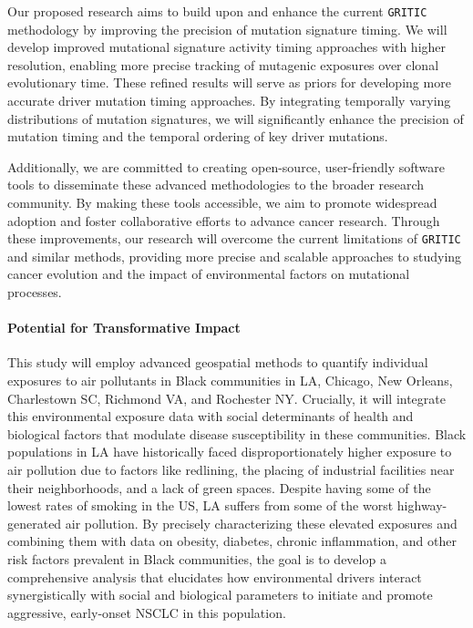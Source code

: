 \vspace{1em}
\noindent
Our proposed research aims to build upon and enhance the current \texttt{GRITIC} methodology by 
improving the precision of mutation signature timing. 
We will develop improved mutational signature activity timing approaches with higher resolution, 
enabling more precise tracking of mutagenic exposures over clonal evolutionary time. 
These refined results will serve as priors for developing more accurate driver mutation timing approaches. 
By integrating temporally varying distributions of mutation signatures, 
we will significantly enhance the precision of mutation timing and the temporal ordering of key driver mutations.

\vspace{1em}
\noindent
Additionally, we are committed to creating open-source, user-friendly software tools to disseminate these advanced methodologies to the broader research community. 
By making these tools accessible, we aim to promote widespread adoption and foster collaborative efforts to advance cancer research.
Through these improvements, our research will overcome the current limitations of \texttt{GRITIC} and similar methods, 
providing more precise and scalable approaches to studying cancer evolution and the impact of environmental factors on mutational processes.

\paragraph{Potential for Transformative Impact}

This study will employ advanced geospatial methods to quantify individual exposures to air pollutants 
in Black communities in LA, Chicago, New Orleans, Charlestown SC, Richmond VA, and Rochester NY. 
Crucially, it will integrate this environmental exposure data with social determinants of health and biological factors 
that modulate disease susceptibility in these communities. 
Black populations in LA have historically faced disproportionately higher exposure to air pollution 
due to factors like redlining, the placing of industrial facilities near their neighborhoods, and a lack of green spaces. 
Despite having some of the lowest rates of smoking in the US, LA suffers from some of the worst highway-generated air pollution. 
By precisely characterizing these elevated exposures and combining them with data on 
obesity, diabetes, chronic inflammation, and other risk factors prevalent in Black communities, 
the goal is to develop a comprehensive analysis that elucidates how environmental drivers interact synergistically with 
social and biological parameters to initiate and promote aggressive, early-onset NSCLC in this population. 

